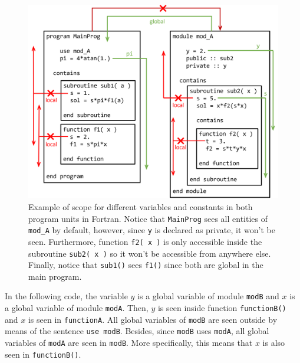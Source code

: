 \begin{figure}[h]
    \centering
    \includegraphics[width= \textwidth]{./doc/Figures/ScopeFor.png}
    \caption{Example of scope for different variables and constants in both program units in Fortran. Notice that \texttt{MainProg} sees all entities of \texttt{mod\_A} by default, however, since \texttt{y} is declared as private, it won't be seen. Furthermore, function \texttt{f2( x )} is only accessible inside the subroutine \texttt{sub2( x )} so it won't be accessible from anywhere else. Finally, notice that \texttt{sub1()} sees \texttt{f1()} since both are global in the main program.}
    \label{fig:ScopeFor}
\end{figure}





In the following code, the variable $y$ is a global variable of module \texttt{modB} and $x$ is a global variable of module \texttt{modA}.  
Then, $y$ is seen inside function \texttt{functionB()} and $x$ is seen in \texttt{functionA}.
All global variables of \texttt{modB} are seen outside by means of the sentence \texttt{use modB}. 
Besides, since \texttt{modB} uses \texttt{modA}, all global variables of \texttt{modA} are seen in \texttt{modB}. 
More specifically, this means that $x$ is also seen in \texttt{functionB()}. 
\vspace{0.5cm} 
 
